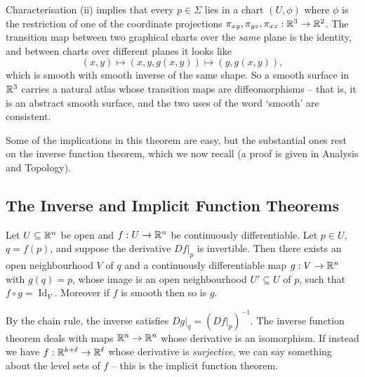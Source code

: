 \documentclass[a4paper]{scrartcl}
\begin{document}
\begin{remark}
    Characterisation (ii) implies that every $p \in \Sigma$ lies in a chart $(U, \phi)$ where $\phi$ is the restriction of one of the coordinate projections $\pi_{xy}, \pi_{yz}, \pi_{xz}: \mathbb{R}^3 \rightarrow \mathbb{R}^2$. The transition map between two graphical charts over the \emph{same} plane is the identity, and between charts over different planes it looks like
    $$
    (x, y) \mapsto (x, y, g(x,y)) \mapsto (y, g(x, y)),
    $$
    which is smooth with smooth inverse of the same shape. So a smooth surface in $\mathbb{R}^3$ carries a natural atlas whose transition maps are diffeomorphisms -- that is, it is an abstract smooth surface, and the two uses of the word `smooth' are consistent.
\end{remark}

Some of the implications in this theorem are easy, but the substantial ones rest on the inverse function theorem, which we now recall (a proof is given in Analysis and Topology).

\subsection{The Inverse and Implicit Function Theorems}

\begin{theorem}
    Let $U \subseteq \mathbb{R}^n$ be open and $f: U \rightarrow \mathbb{R}^n$ be continuously differentiable. Let $p \in U$, $q = f(p)$, and suppose the derivative $\left.Df\right|_p$ is invertible. Then there exists an open neighbourhood $V$ of $q$ and a continuously differentiable map $g: V \rightarrow \mathbb{R}^n$ with $g(q) = p$, whose image is an open neighbourhood $U' \subseteq U$ of $p$, such that $f \circ g = \operatorname{Id}_V$. Moreover if $f$ is smooth then so is $g$.
\end{theorem}

By the chain rule, the inverse satisfies $\left.Dg\right|_q = (\left.Df\right|_p)^{-1}$.
The inverse function theorem deals with maps $\mathbb{R}^n \rightarrow \mathbb{R}^n$ whose derivative is an isomorphism. If instead we have $f : \mathbb{R}^{k + \ell} \rightarrow \mathbb{R}^\ell$ whose derivative is \emph{surjective}, we can say something about the level sets of $f$ -- this is the implicit function theorem.
\end{document}
